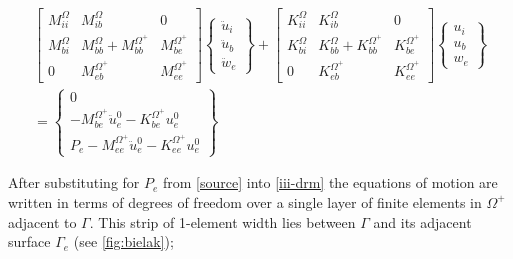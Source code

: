 \documentclass[12pt,letterpaper]{article}
\begin{document}
\begin{equation}
\begin{array}{l}
\left[ {\begin{array}{*{20}{c}}
{M_{ii}^\Omega }&{M_{ib}^\Omega }&0\\
{M_{bi}^\Omega }&{M_{bb}^\Omega  + M_{bb}^{{\Omega ^ + }}}&{M_{be}^{{\Omega ^ + }}}\\
0&{M_{eb}^{{\Omega ^ + }}}&{M_{ee}^{{\Omega ^ + }}}
\end{array}} \right]\left\{ {\begin{array}{*{20}{c}}
{{{\ddot u}_i}}\\
{{{\ddot u}_b}}\\
{{{\ddot w}_e}}
\end{array}} \right\} + \left[ {\begin{array}{*{20}{c}}
{K_{ii}^\Omega }&{K_{ib}^\Omega }&0\\
{K_{bi}^\Omega }&{K_{bb}^\Omega  + K_{bb}^{{\Omega ^ + }}}&{K_{be}^{{\Omega ^ + }}}\\
0&{K_{eb}^{{\Omega ^ + }}}&{K_{ee}^{{\Omega ^ + }}}
\end{array}} \right]\left\{ {\begin{array}{*{20}{c}}
{{u_i}}\\
{{u_b}}\\
{{w_e}}
\end{array}} \right\}\\
 = \left\{ {\begin{array}{*{20}{c}}
0\\
{ - M_{be}^{{\Omega ^ + }}\ddot u_e^0 - K_{be}^{{\Omega ^ + }}u_e^0}\\
{{P_e} - M_{ee}^{{\Omega ^ + }}\ddot u_e^0 - K_{ee}^{{\Omega ^ + }}u_e^0}
\end{array}} \right\}
\end{array}
\label{iii-drm}
\end{equation}

After substituting for $P_e$ from \cref{source} into \cref{iii-drm} the equations of motion are written in terms of degrees of freedom over a single layer of finite elements in $\Omega^+$ adjacent to $\Gamma$. This strip of 1-element width lies between $\Gamma$ and its adjacent surface $\Gamma_e$ (see \cref{fig:bielak});
\end{document}
